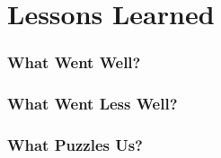 \section{Lessons Learned}\label{sec:lessons_learned}

\subsubsection{What Went Well?}\label{ssub:well}

\subsubsection{What Went Less Well?}\label{ssub:less_well}

\subsubsection{What Puzzles Us?}\label{ssub:puzzles}
